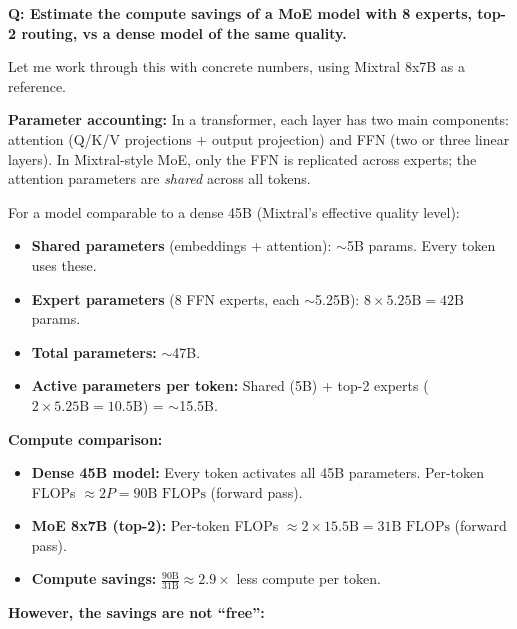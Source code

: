 \begin{interviewq}
\textbf{Q: Estimate the compute savings of a MoE model with 8 experts, top-2 routing, vs a dense model of the same quality.}

 \quad {} \quad \badgefreq{\freqmed}

\stronganswer

Let me work through this with concrete numbers, using Mixtral 8x7B as a reference.

\textbf{Parameter accounting:} In a transformer, each layer has two main components: attention (Q/K/V projections + output projection) and FFN (two or three linear layers). In Mixtral-style MoE, only the FFN is replicated across experts; the attention parameters are \textit{shared} across all tokens.

For a model comparable to a dense 45B (Mixtral's effective quality level):
\begin{itemize}
    \item \textbf{Shared parameters} (embeddings + attention): $\sim$5B params. Every token uses these.
    \item \textbf{Expert parameters} (8 FFN experts, each $\sim$5.25B): $8 \times 5.25\text{B} = 42\text{B}$ params.
    \item \textbf{Total parameters:} $\sim$47B.
    \item \textbf{Active parameters per token:} Shared (5B) + top-2 experts ($2 \times 5.25\text{B} = 10.5\text{B}$) = $\sim$15.5B.
\end{itemize}

\textbf{Compute comparison:}
\begin{itemize}
    \item \textbf{Dense 45B model:} Every token activates all 45B parameters. Per-token FLOPs $\approx 2P = 90\text{B FLOPs}$ (forward pass).
    \item \textbf{MoE 8x7B (top-2):} Per-token FLOPs $\approx 2 \times 15.5\text{B} = 31\text{B FLOPs}$ (forward pass).
    \item \textbf{Compute savings:} $\frac{90\text{B}}{31\text{B}} \approx 2.9\times$ less compute per token.
\end{itemize}

\textbf{However, the savings are not ``free'':}


\end{interviewq}
